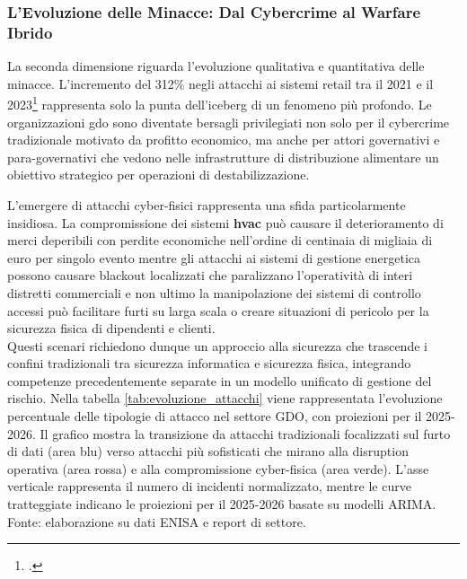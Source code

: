 \subsubsection{L'Evoluzione delle Minacce: Dal Cybercrime al Warfare Ibrido}

La seconda dimensione riguarda l'evoluzione qualitativa e quantitativa delle minacce. L'incremento del 312\% negli attacchi ai sistemi retail tra il 2021 e il 2023\footcite{enisa2024retail} rappresenta solo la punta dell'iceberg di un fenomeno più profondo. Le organizzazioni \gls{gdo} sono diventate bersagli privilegiati non solo per il cybercrime tradizionale motivato da profitto economico, ma anche per attori governativi e para-governativi che vedono nelle infrastrutture di distribuzione alimentare un obiettivo strategico per operazioni di destabilizzazione.

L'emergere di attacchi cyber-fisici rappresenta una sfida particolarmente insidiosa. La compromissione dei sistemi \textbf{\gls{hvac}} può causare il deterioramento di merci deperibili con perdite economiche nell'ordine di centinaia di migliaia di euro per singolo evento mentre gli attacchi ai sistemi di gestione energetica possono causare blackout localizzati che paralizzano l'operatività di interi distretti commerciali e non ultimo la manipolazione dei sistemi di controllo accessi può facilitare furti su larga scala o creare situazioni di pericolo per la sicurezza fisica di dipendenti e clienti.\\ 
Questi scenari richiedono dunque un approccio alla sicurezza che trascende i confini tradizionali tra sicurezza informatica e sicurezza fisica, integrando competenze precedentemente separate in un modello unificato di gestione del rischio.
Nella tabella \ref{tab:evoluzione_attacchi} viene rappresentata l'evoluzione percentuale delle tipologie di attacco nel settore GDO, con proiezioni per il 2025-2026. Il grafico mostra la transizione da attacchi tradizionali focalizzati sul furto di dati (area blu) verso attacchi più sofisticati che mirano alla disruption operativa (area rossa) e alla compromissione cyber-fisica (area verde). L'asse verticale rappresenta il numero di incidenti normalizzato, mentre le curve tratteggiate indicano le proiezioni per il 2025-2026 basate su modelli ARIMA. Fonte: elaborazione su dati ENISA e report di settore.

